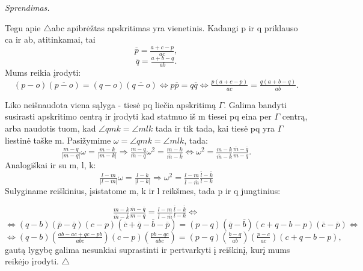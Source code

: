 \documentclass[11pt,a4paper,twoside]{book}
\newenvironment{sprendimas}{\noindent \textit{Sprendimas.}}{\hfill $\triangle$}
\theoremstyle{definition} \newtheorem*{api}{Apibrėžimas}
\theoremstyle{remark} \newtheorem*{pastaba}{Pastaba}
\begin{document}
\begin{sprendimas}

Tegu apie $\bigtriangleup$abc apibrėžtas apskritimas yra vienetinis. Kadangi p ir q priklauso ca ir ab, atitinkamai, tai
\begin{equation*}
\overline{p}=\tfrac{a+c-p}{ac},
\end{equation*}
\begin{equation*}
\overline{q}=\tfrac{a+b-q}{ab}.
\end{equation*}
Mums reikia įrodyti:
\begin{equation*}
(p-o)(\overline{p-o})=(q-o)(\overline{q-o}) \Leftrightarrow p\overline{p}=q\overline{q} \Leftrightarrow \tfrac{p(a+c-p)}{ac}=\tfrac{q(a+b-q)}{ab}.
\end{equation*}

Liko neišnaudota viena sąlyga - tiesė pq liečia apskritimą $\Gamma$. Galima bandyti susirasti apskritimo centrą ir įrodyti kad statmuo iš m tiesei pq eina per $\Gamma$ centrą, arba naudotis tuom, kad $\angle qmk=\angle mlk$ tada ir tik tada, kai tiesė pq yra $\Gamma$ liestinė taške m. Pasižymime $\omega=\angle qmk=\angle mlk$, tada:
\begin{equation*}
\tfrac{m-q}{|m-q|}\omega=\tfrac{m-k}{|m-k|} \Rightarrow \tfrac{m-q}{\overline{m}-\overline{q}}\omega^2=\tfrac{m-k}{\overline{m}-\overline{k}} \Leftrightarrow \omega^2=\tfrac{m-k}{\overline{m}-\overline{k}} \tfrac{\overline{m}-\overline{q}}{m-q}.
\end{equation*}
Analogiškai ir su m, l, k:
\begin{equation*}
\tfrac{l-m}{|l-m|}\omega=\tfrac{l-k}{|l-k|} \Rightarrow  \omega^2=\tfrac{l-m}{\overline{l}-\overline{m}}\tfrac{\overline{l}-\overline{k}}{l-k}
\end{equation*}
Sulyginame reiškinius, įsistatome m, k ir l reikšmes, tada p ir q jungtinius:

\begin{equation*}
 \tfrac{m-k}{\overline{m}-\overline{k}} \tfrac{\overline{m}-\overline{q}}{m-q}=\tfrac{l-m}{\overline{l}-\overline{m}}\tfrac{\overline{l}-\overline{k}}{l-k} \Leftrightarrow 
\end{equation*}
\begin{equation*}
 \Leftrightarrow (q-b)(\overline{p}-\overline{q})(c-p)(\overline{c}+\overline{q}-\overline{b}-\overline{p})=(p-q)(\overline{q}-\overline{b})(c+q-b-p)(\overline{c}-\overline{p}) \Leftrightarrow
\end{equation*}
\begin{equation*}
\Leftrightarrow (q-b)(\tfrac{ab-ac+qc-pb}{abc})(c-p)(\tfrac{pb-qc}{abc})=(p-q)(\tfrac{b-q}{ab})(\tfrac{p-c}{ac})(c+q-b-p),
\end{equation*}
gautą lygybę galima nesunkiai suprastinti ir pertvarkyti į reiškinį, kurį mums reikėjo įrodyti.
\end{sprendimas}
\end{document}
